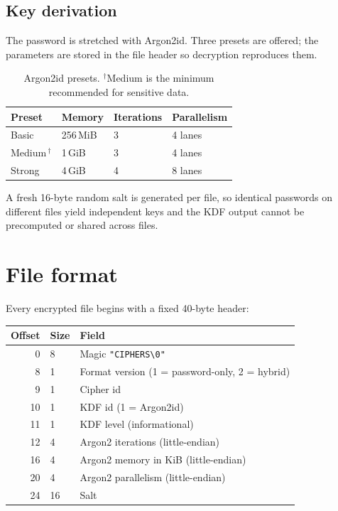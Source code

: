 \documentclass[11pt,a4paper]{article}
\newcommand{\code}[1]{\texttt{#1}}
\begin{document}
\subsection{Key derivation}
\label{sec:kdf}

The password is stretched with Argon2id. Three presets are offered; the
parameters are stored in the file header so decryption reproduces them.

\begin{table}[h]
\centering
\begin{tabular}{@{}llll@{}}
\toprule
\textbf{Preset} & \textbf{Memory} & \textbf{Iterations} & \textbf{Parallelism}\\
\midrule
Basic   & 256\,MiB & 3 & 4 lanes\\
Medium\,$^\dagger$ & 1\,GiB   & 3 & 4 lanes\\
Strong  & 4\,GiB   & 4 & 8 lanes\\
\bottomrule
\end{tabular}
\caption{Argon2id presets. $^\dagger$Medium is the minimum recommended for
sensitive data.}
\label{tab:kdf}
\end{table}

A fresh 16-byte random salt is generated per file, so identical passwords on
different files yield independent keys and the KDF output cannot be
precomputed or shared across files.

\section{File format}

Every encrypted file begins with a fixed 40-byte header:

\begin{center}
\begin{tabular}{@{}rll@{}}
\toprule
\textbf{Offset} & \textbf{Size} & \textbf{Field}\\
\midrule
0  & 8  & Magic \code{"CIPHERS\textbackslash0"}\\
8  & 1  & Format version (1 = password-only, 2 = hybrid)\\
9  & 1  & Cipher id\\
10 & 1  & KDF id (1 = Argon2id)\\
11 & 1  & KDF level (informational)\\
12 & 4  & Argon2 iterations (little-endian)\\
16 & 4  & Argon2 memory in KiB (little-endian)\\
20 & 4  & Argon2 parallelism (little-endian)\\
24 & 16 & Salt\\
\bottomrule
\end{tabular}
\end{center}
\end{document}
